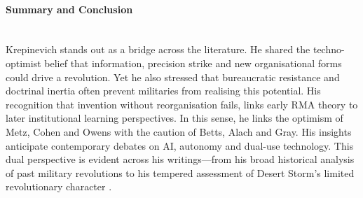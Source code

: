 \paragraph{Summary and Conclusion}\mbox{}\\
Krepinevich stands out as a bridge across the literature. He shared the techno-optimist belief that information, precision strike and new organisational forms could drive a revolution. Yet he also stressed that bureaucratic resistance and doctrinal inertia often prevent militaries from realising this potential. His recognition that invention without reorganisation fails, links early RMA theory to later institutional learning perspectives. In this sense, he links the optimism of Metz, Cohen and Owens with the caution of Betts, Alach and Gray. His insights anticipate contemporary debates on AI, autonomy and dual-use technology. This dual perspective is evident across his writings—from his broad historical analysis of past military revolutions \parencite{KREP_1994} to his tempered assessment of Desert Storm’s limited revolutionary character \parencite{KREPINEVICH_1996}.







